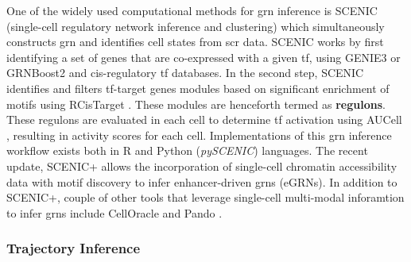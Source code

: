 \par One of the widely used computational methods for \gls{grn} inference is SCENIC (single-cell regulatory network inference and clustering) \textbf{\cite{aibar_scenic_2017,van_de_sande_scalable_2020}} which simultaneously constructs \gls{grn} and identifies cell states from \gls{scr} data. SCENIC works by first identifying a set of genes that are co-expressed with a given \gls{tf}, using GENIE3 \textbf{\cite{huynh-thu_inferring_2010}} or GRNBoost2 \textbf{\cite{moerman_grnboost2_2019}} and cis-regulatory \gls{tf} databases. In the second step, SCENIC identifies and filters \gls{tf}-target genes modules based on significant enrichment of motifs using  RCisTarget \textbf{\cite{aibar_scenic_2017,aibar_rcistarget_nodate}}. These modules are henceforth termed as \textbf{regulons}. These regulons are evaluated in each cell to determine \gls{tf} activation using AUCell \textbf{\cite{aibar_scenic_2017,aibar_aucell_nodate}}, resulting in activity scores for each cell. Implementations of this \gls{grn} inference workflow exists both in R and Python (\textit{pySCENIC}) \textbf{\cite{kumar_inference_2021}} languages. The recent update, SCENIC+ \textbf{\cite{bravo_gonzalez-blas_scenic_2023}} allows the incorporation of single-cell chromatin accessibility data with motif discovery to infer enhancer-driven \glspl{grn} (eGRNs). In addition to SCENIC+, couple of other tools that leverage single-cell multi-modal inforamtion to infer \glspl{grn} include CellOracle \textbf{\cite{kamimoto_dissecting_2023}} and Pando \textbf{\cite{fleck_inferring_2023}}. 



\subsubsection{Trajectory Inference}
\label{subsubsec:chp1_int_trajectory}


